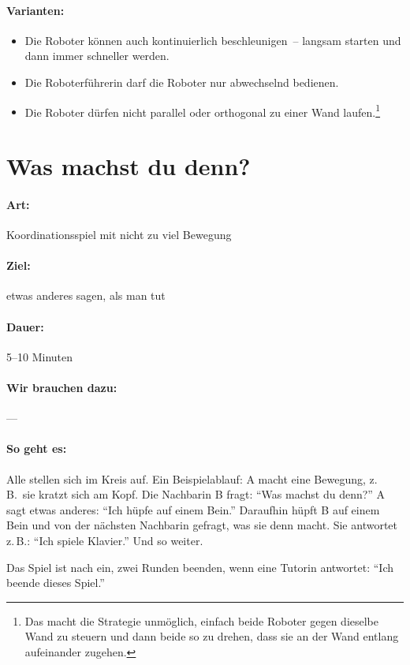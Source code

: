\paragraph{Varianten:}
\begin{itemize}
  \item Die Roboter können auch kontinuierlich beschleunigen~-- langsam starten und dann immer schneller werden.
  \item Die Roboterführerin darf die Roboter nur abwechselnd bedienen.
  \item Die Roboter dürfen nicht parallel oder orthogonal zu einer Wand laufen.\footnote{Das macht die Strategie unmöglich, einfach beide Roboter gegen dieselbe Wand zu steuern und dann beide so zu drehen, dass sie an der Wand entlang aufeinander zugehen.}
\end{itemize}

\section{Was machst du denn?}
\paragraph{Art:} Koordinationsspiel mit nicht zu viel Bewegung
\paragraph{Ziel:} etwas anderes sagen, als man tut
\paragraph{Dauer:} 5--10 Minuten
\paragraph{Wir brauchen dazu:} ---
\paragraph{So geht es:} Alle stellen sich im Kreis auf. Ein Beispielablauf: A macht eine Bewegung, z.\,B.~sie kratzt sich am Kopf. Die Nachbarin B fragt: "`Was machst du denn?"' A sagt etwas anderes: "`Ich hüpfe auf einem Bein."'
Daraufhin hüpft B auf einem Bein und von der nächsten Nachbarin gefragt, was sie denn macht. Sie antwortet z.\,B.: "`Ich spiele Klavier."' Und so weiter.

Das Spiel ist nach ein, zwei Runden beenden, wenn eine Tutorin antwortet: "`Ich beende dieses Spiel."'
